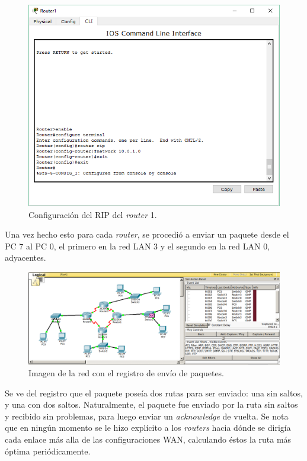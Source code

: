\documentclass[spanish]{udpreport}
\begin{document}
\begin{figure}[H]
	\begin{center}
		\includegraphics[width= 17cm]{Imagenes/config_rip}
		\caption{Configuración del RIP del \textit{router} 1.}
	\end{center}
\end{figure}

Una vez hecho esto para cada \textit{router}, se procedió a enviar un paquete desde el PC 7 al PC 0, el primero en la red LAN 3 y el segundo en la red LAN 0, adyacentes.

\begin{figure}[H]
	\begin{center}
		\includegraphics[width= 17cm]{Imagenes/envio_rip}
		\caption{Imagen de la red con el registro de envío de paquetes.}
	\end{center}
\end{figure}

Se ve del registro que el paquete poseía dos rutas para ser enviado: una sin saltos, y una con dos saltos. Naturalmente, el paquete fue enviado por la ruta sin saltos y recibido sin problemas, para luego enviar un \textit{acknowledge} de vuelta. Se nota que en ningún momento se le hizo explícito a los \textit{routers} hacia dónde se dirigía cada enlace más alla de las configuraciones WAN, calculando éstos la ruta más óptima periódicamente.
\end{document}
